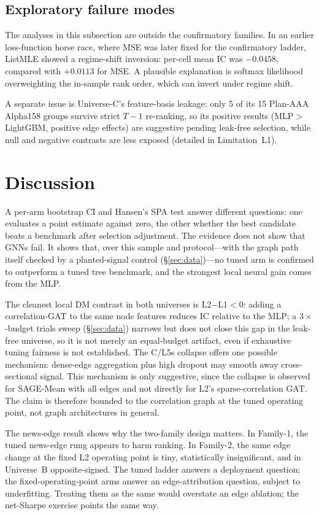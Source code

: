 \documentclass[sigconf,nonacm]{acmart}
\begin{document}
\subsection{Exploratory failure modes}\label{sec:exploratory}
The analyses in this subsection are outside the confirmatory families. In an earlier loss-function horse race, where MSE was later fixed for the confirmatory ladder, ListMLE showed a regime-shift inversion: per-cell mean IC was $-0.0458$, compared with $+0.0113$ for MSE. A plausible explanation is softmax likelihood overweighting the in-sample rank order, which can invert under regime shift.

A separate issue is Universe-C's feature-basis leakage: only 5 of its 15 Plan-AAA Alpha158 groups survive strict $T-1$ re-ranking, so its positive results (MLP${}>{}$LightGBM, positive edge effects) are suggestive pending leak-free selection, while null and negative contrasts are less exposed (detailed in Limitation~L1).

\section{Discussion}\label{sec:discussion}
A per-arm bootstrap CI and Hansen's SPA test answer different questions: one evaluates a point estimate against zero, the other whether the best candidate beats a benchmark after selection adjustment. The evidence does not show that GNNs fail. It shows that, over this sample and protocol---with the graph path itself checked by a planted-signal control (\S\ref{sec:data})---no tuned arm is confirmed to outperform a tuned tree benchmark, and the strongest local neural gain comes from the MLP.

The cleanest local DM contrast in both universes is L2$-$L1${}<0$: adding a correlation-GAT to the same node features reduces IC relative to the MLP; a $3\times$-budget trials sweep (\S\ref{sec:data}) narrows but does not close this gap in the leak-free universe, so it is not merely an equal-budget artifact, even if exhaustive tuning fairness is not established. The C/L5s collapse offers one possible mechanism: dense-edge aggregation plus high dropout may smooth away cross-sectional signal. This mechanism is only suggestive, since the collapse is observed for SAGE-Mean with all edges and not directly for L2's sparse-correlation GAT. The claim is therefore bounded to the correlation graph at the tuned operating point, not graph architectures in general.

The news-edge result shows why the two-family design matters. In Family-1, the tuned news-edge rung appears to harm ranking. In Family-2, the same edge change at the fixed L2 operating point is tiny, statistically insignificant, and in Universe~B opposite-signed. The tuned ladder answers a deployment question; the fixed-operating-point arms answer an edge-attribution question, subject to underfitting. Treating them as the same would overstate an edge ablation; the net-Sharpe exercise points the same way.
\end{document}

